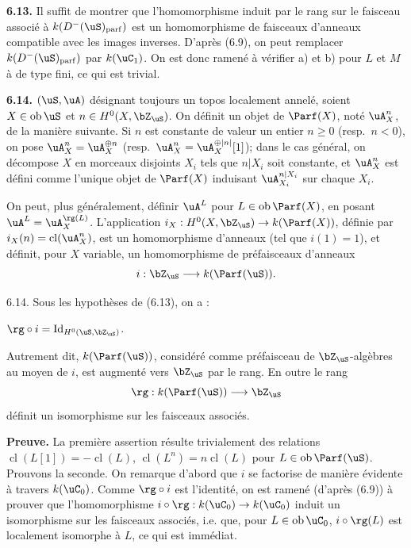 \noindent\textbf{6.13.} Il suffit de montrer que l'homomorphisme induit par le rang sur le faisceau associ\'{e} \`{a} $k(D^-(\uS)_{\mathrm{parf}})$ est un homomorphisme de faisceaux d'anneaux compatible avec les images inverses. D'apr\`{e}s (6.9), on peut remplacer $k(D^-(\uS)_{\mathrm{parf}})$ par $k(\uC_1)$. On est donc ramen\'{e} \`{a} v\'{e}rifier a) et b) pour $L$ et $M$ \`{a} de type fini, ce qui est trivial.

\bigskip
\noindent\textbf{6.14.} $(\uS,\uA)$ d\'{e}signant toujours un topos localement annel\'{e}, soient $X \in \operatorname{ob} \uS$ et $n \in H^0(X,\bZ_{\uS})$. On d\'{e}finit un objet de $\Parf(X)$, not\'{e} $\uA_X^n$, de la mani\`{e}re suivante. Si $n$ est constante de valeur un entier $n \geq 0$ (resp.~$n < 0$), on pose $\uA_X^n = \uA_X^{\oplus n}$ (resp.~$\uA_X^n = \uA_X^{\oplus |n|}[1]$); dans le cas g\'{e}n\'{e}ral, on d\'{e}compose $X$ en morceaux disjoints $X_i$ tels que $n|X_i$ soit constante, et $\uA_X^n$ est d\'{e}fini comme l'unique objet de $\Parf(X)$ induisant $\uA_{X_i}^{n|X_i}$ sur chaque $X_i$.

On peut, plus g\'{e}n\'{e}ralement, d\'{e}finir $\uA^L$ pour $L \in \operatorname{ob} \Parf(X)$, en posant $\uA^L = \uA_X^{\rg(L)}$. L'application $i_X : H^0(X,\bZ_{\uS}) \rightarrow k(\Parf(X))$, d\'{e}finie par $i_X(n) = \operatorname{cl}(\uA_X^n)$, est un homomorphisme d'anneaux (tel que $i(1) = 1$), et d\'{e}finit, pour $X$ variable, un homomorphisme de pr\'{e}faisceaux d'anneaux
\[
i : \bZ_{\uS} \longrightarrow k(\Parf(\uS)) .
\]

\begin{proposition} 6.14.
Sous les hypoth\`{e}ses de (6.13), on a :

$\rg \circ i = \operatorname{Id}_{H^0(\uS,\bZ_{\uS})}$.

Autrement dit, $k(\Parf(\uS))$, consid\'{e}r\'{e} comme pr\'{e}faisceau de $\bZ_{\uS}$-alg\`{e}bres au moyen de $i$, est augment\'{e} vers $\bZ_{\uS}$ par le rang. En outre le rang
\[
\rg : k(\Parf(\uS)) \longrightarrow \bZ_{\uS}
\]
d\'{e}finit un isomorphisme sur les faisceaux associ\'{e}s.
\end{proposition}

\noindent\textbf{Preuve.} La premi\`{e}re assertion r\'{e}sulte trivialement des relations $\operatorname{cl}(L[1]) = -\operatorname{cl}(L)$, $\operatorname{cl}(L^n) = n\operatorname{cl}(L)$ pour $L \in \operatorname{ob} \Parf(\uS)$. Prouvons la seconde. On remarque d'abord que $i$ se factorise de mani\`{e}re \'{e}vidente \`{a} travers $k(\uC_0)$. Comme $\rg \circ i$ est l'identit\'{e}, on est ramen\'{e} (d'apr\`{e}s (6.9)) \`{a} prouver que l'homomorphisme $i \circ \rg : k(\uC_0) \rightarrow k(\uC_0)$ induit un isomorphisme sur les faisceaux associ\'{e}s, i.e. que, pour $L \in \operatorname{ob} \uC_0$, $i \circ \rg(L)$ est localement isomorphe \`{a} $L$, ce qui est imm\'{e}diat.

